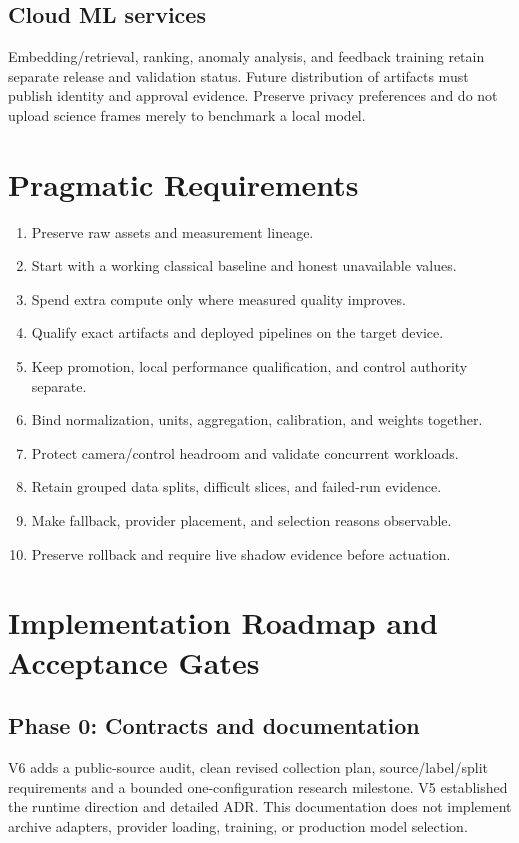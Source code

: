 \documentclass[11pt,a4paper]{article}
\begin{document}
\subsection{Cloud ML services}
Embedding/retrieval, ranking, anomaly analysis, and feedback training retain
separate release and validation status. Future distribution of artifacts must
publish identity and approval evidence. Preserve privacy preferences and do
not upload science frames merely to benchmark a local model.

\section{Pragmatic Requirements}
\begin{enumerate}
\item Preserve raw assets and measurement lineage.
\item Start with a working classical baseline and honest unavailable values.
\item Spend extra compute only where measured quality improves.
\item Qualify exact artifacts and deployed pipelines on the target device.
\item Keep promotion, local performance qualification, and control authority separate.
\item Bind normalization, units, aggregation, calibration, and weights together.
\item Protect camera/control headroom and validate concurrent workloads.
\item Retain grouped data splits, difficult slices, and failed-run evidence.
\item Make fallback, provider placement, and selection reasons observable.
\item Preserve rollback and require live shadow evidence before actuation.
\end{enumerate}

\section{Implementation Roadmap and Acceptance Gates}
\subsection{Phase 0: Contracts and documentation}
V6 adds a public-source audit, clean revised collection plan, source/label/split
requirements and a bounded one-configuration research milestone. V5 established
the runtime direction and detailed ADR. This documentation does not implement
archive adapters, provider loading, training, or production model selection.
\end{document}
